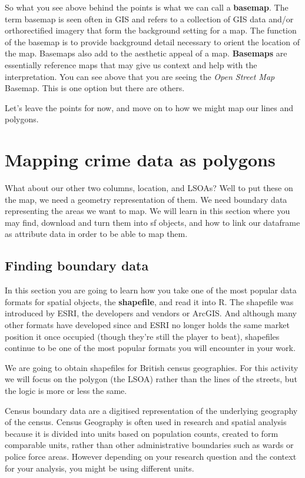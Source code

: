 \documentclass[
  krantz2]{krantz}
\begin{document}
So what you see above behind the points is what we can call a \textbf{basemap}. The term basemap is seen often in GIS and refers to a collection of GIS data and/or orthorectified imagery that form the background setting for a map. The function of the basemap is to provide background detail necessary to orient the location of the map. Basemaps also add to the aesthetic appeal of a map. \textbf{Basemaps} are essentially reference maps that may give us context and help with the interpretation. You can see above that you are seeing the \emph{Open Street Map} Basemap. This is one option but there are others.

Let's leave the points for now, and move on to how we might map our lines and polygons.

\hypertarget{mapping-crime-data-as-polygons}{%
\section{Mapping crime data as polygons}\label{mapping-crime-data-as-polygons}}

What about our other two columns, location, and LSOAs? Well to put these on the map, we need a geometry representation of them. We need boundary data representing the areas we want to map. We will learn in this section where you may find, download and turn them into sf objects, and how to link our dataframe as attribute data in order to be able to map them.

\hypertarget{finding-boundary-data}{%
\subsection{Finding boundary data}\label{finding-boundary-data}}

In this section you are going to learn how you take one of the most popular data formats for spatial objects, the \textbf{shapefile}, and read it into R. The shapefile was introduced by ESRI, the developers and vendors or ArcGIS. And although many other formats have developed since and ESRI no longer holds the same market position it once occupied (though they're still the player to beat), shapefiles continue to be one of the most popular formats you will encounter in your work.

We are going to obtain shapefiles for British census geographies. For this activity we will focus on the polygon (the LSOA) rather than the lines of the streets, but the logic is more or less the same.

Census boundary data are a digitised representation of the underlying geography of the census. Census Geography is often used in research and spatial analysis because it is divided into units based on population counts, created to form comparable units, rather than other administrative boundaries such as wards or police force areas. However depending on your research question and the context for your analysis, you might be using different units.
\end{document}
